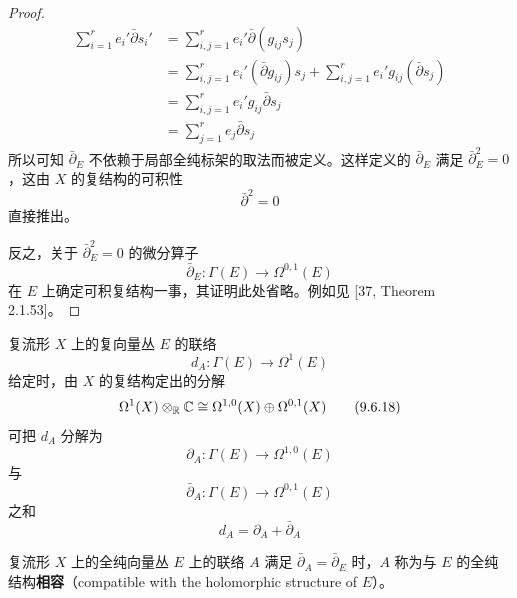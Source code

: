 \begin{proof}
\begin{align}
  \sum_{i=1}^r e_i' \bar\partial s_i' &= \sum_{i,j=1}^r e_i'\bar\partial(g_{ij}s_j)
  \tag{9.6.11}\\
  &= \sum_{i,j=1}^r e_i'(\bar\partial g_{ij})s_j + \sum_{i,j=1}^r e_i' g_{ij}(\bar\partial s_j)
  \tag{9.6.12}\\
  &= \sum_{i,j=1}^r e_i' g_{ij}\bar\partial s_j
  \tag{9.6.13}\\
  &= \sum_{j=1}^r e_j \bar\partial s_j
  \tag{9.6.14}
\end{align}
所以可知 $\bar\partial_E$ 不依赖于局部全纯标架的取法而被定义。这样定义的 $\bar\partial_E$ 满足 $\bar\partial_E^2=0$，这由 $X$ 的复结构的可积性
\begin{equation}
  \bar\partial^2 = 0
  \tag{9.6.15}
\end{equation}
直接推出。

反之，关于 $\bar\partial_E^2=0$ 的微分算子
\begin{equation}
  \bar\partial_E\colon \Gamma(E)\to\Omega^{0,1}(E)
  \tag{9.6.16}
\end{equation}
在 $E$ 上确定可积复结构一事，其证明此处省略。例如见 [37, Theorem 2.1.53]。
\end{proof}

复流形 $X$ 上的复向量丛 $E$ 的联络
\begin{equation}
  d_A\colon \Gamma(E)\to\Omega^1(E)
  \tag{9.6.17}
\end{equation}
给定时，由 $X$ 的复结构定出的分解
\begin{equation}
  \Omega^1(X)\otimes_{\mathbb{R}}\mathbb{C} \cong \Omega^{1,0}(X)\oplus\Omega^{0,1}(X)
  \tag{9.6.18}
\end{equation}
可把 $d_A$ 分解为
\begin{equation}
  \partial_A\colon \Gamma(E)\to\Omega^{1,0}(E)
  \tag{9.6.19}
\end{equation}
与
\begin{equation}
  \bar\partial_A\colon \Gamma(E)\to\Omega^{0,1}(E)
  \tag{9.6.20}
\end{equation}
之和
\begin{equation}
  d_A = \partial_A + \bar\partial_A
  \tag{9.6.21}
\end{equation}

复流形 $X$ 上的全纯向量丛 $E$ 上的联络 $A$ 满足 $\bar\partial_A = \bar\partial_E$ 时，$A$ 称为与 $E$ 的全纯结构\textbf{相容}（compatible with the holomorphic structure of $E$）。


